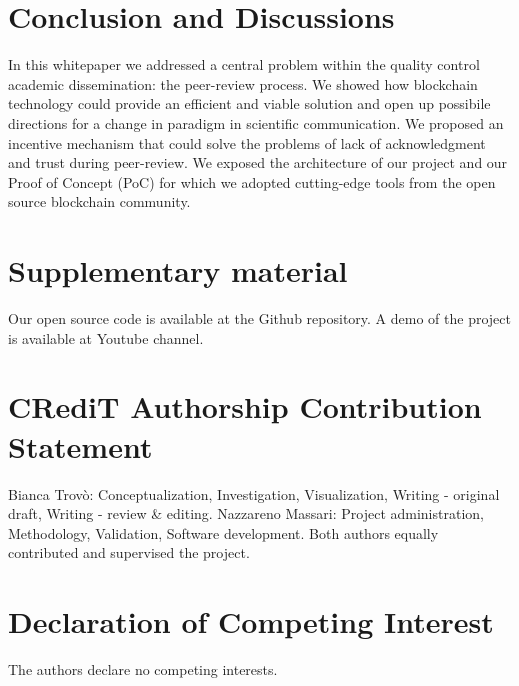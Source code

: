 \documentclass[runningheads]{llncs}
\begin{document}
\section{Conclusion and Discussions}
In this whitepaper we addressed a central problem within the quality control academic dissemination: the peer-review process. We showed how blockchain technology could provide an efficient and viable solution and open up possibile directions for a change in paradigm in scientific communication. We proposed an incentive mechanism that could solve the problems of lack of acknowledgment and trust during peer-review. We exposed the architecture of our project and our Proof of Concept (PoC) for which we adopted cutting-edge tools from the open source blockchain community.

\section{Supplementary material}
Our open source code is available at the Github repository. A demo of the project is available at Youtube channel.
\section{CRediT Authorship Contribution Statement}
Bianca Trovò: Conceptualization, Investigation, Visualization, Writing - original draft, Writing - review \& editing. Nazzareno Massari: Project administration, Methodology, Validation, Software development. Both authors equally contributed and supervised the project.
\section{Declaration of Competing Interest}
The authors declare no competing interests.

%
%


\end{document}
